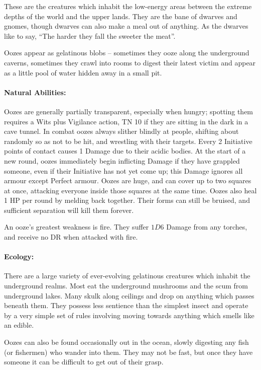 \begin{multicols}{2}

These are the creatures which inhabit the low-energy areas between the extreme depths of the world and the upper lands.
They are the bane of dwarves and gnomes, though dwarves can also make a meal out of anything.
As the dwarves like  to say, ``The harder they fall the sweeter the meat''.

\label{ooze}
Oozes appear as gelatinous blobs -- sometimes they ooze along the underground caverns, sometimes they crawl into rooms to digest their latest victim and appear as a little pool of water hidden away in a small pit.

\paragraph{Natural Abilities:} Oozes are generally partially transparent, especially when hungry; spotting them requires a Wits plus Vigilance action, TN 10 if they are sitting in the dark in a cave tunnel.
In combat oozes always slither blindly at people, shifting about randomly so as not to be hit, and wrestling with their targets.
Every 2 Initiative points of contact causes 1 Damage due to their acidic bodies.
At the start of a new round, oozes immediately begin inflicting Damage if they have grappled someone, even if their Initiative has not yet come up; this Damage ignores all armour except Perfect armour.
Oozes are huge, and can cover up to two squares at once, attacking everyone inside those squares at the same time.
Oozes also heal 1 HP per round by melding back together.
Their forms can still be bruised, and sufficient separation will kill them forever.

An ooze's greatest weakness is fire.
They suffer $1D6$ Damage from any torches, and receive no DR when attacked with fire.

\paragraph{Ecology:} There are a large variety of ever-evolving gelatinous creatures which inhabit the underground realms.  Most eat the underground mushrooms and the scum from underground lakes.  Many skulk along ceilings and drop on anything which passes beneath them.  They possess less sentience than the simplest insect and operate by a very simple set of rules involving moving towards anything which smells like an edible.

Oozes can also be found occasionally out in the ocean, slowly digesting any fish (or fishermen) who wander into them.
They may not be fast, but once they have someone it can be difficult to get out of their grasp.


\end{multicols}
